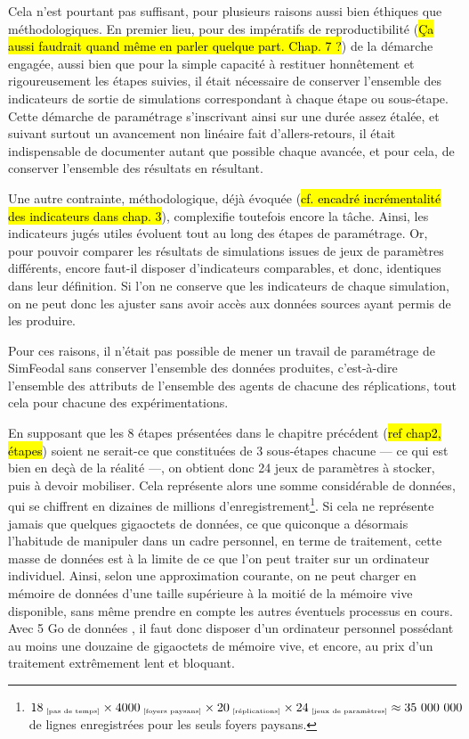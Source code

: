 	Cela n'est pourtant pas suffisant, pour plusieurs raisons aussi bien éthiques que méthodologiques.
	En premier lieu, pour des impératifs de reproductibilité (\hl{Ça aussi faudrait quand même en parler quelque part. Chap. 7 ?}) de la démarche engagée, aussi bien que pour la simple capacité à restituer honnêtement et rigoureusement les étapes suivies, il était nécessaire de conserver l'ensemble des indicateurs de sortie de simulations correspondant à chaque étape ou sous-étape.
	Cette démarche de paramétrage s'inscrivant ainsi sur une durée assez étalée, et suivant surtout un avancement non linéaire fait d'allers-retours, il était indispensable de documenter autant que possible chaque avancée, et pour cela, de conserver l'ensemble des résultats en résultant.

	Une autre contrainte, méthodologique, déjà évoquée (\hl{cf. encadré incrémentalité des indicateurs dans chap. 3}), complexifie toutefois encore la tâche.
	Ainsi, les indicateurs jugés utiles évoluent tout au long des étapes de paramétrage.
	Or, pour pouvoir comparer les résultats de simulations issues de jeux de paramètres différents, encore faut-il disposer d'indicateurs comparables, et donc, identiques dans leur définition.
	Si l'on ne conserve que les indicateurs de chaque simulation, on ne peut donc les ajuster sans avoir accès aux données sources ayant permis de les produire.

	Pour ces raisons, il n'était pas possible de mener un travail de paramétrage de SimFeodal sans conserver l'ensemble des données produites, c'est-à-dire l'ensemble des attributs de l'ensemble des agents de chacune des réplications, tout cela pour chacune des expérimentations.

	En supposant que les 8 étapes présentées dans le chapitre précédent (\hl{ref chap2, étapes}) soient ne serait-ce que constituées de 3 sous-étapes chacune --- ce qui est bien en deçà de la réalité ---, on obtient donc 24 jeux de paramètres à stocker, puis à devoir mobiliser.
	Cela représente alors une somme considérable de données, qui se chiffrent en dizaines de millions d'enregistrement\footnote{
	$18_{\text{\tiny ~[pas de temps]}} \times 4000_{\text{\tiny ~[foyers paysans]}} \times 20_{\text{\tiny ~[réplications]}} \times 24_{\text{\tiny ~[jeux de paramètres]}} \approx 35~000~000$ de lignes enregistrées pour les seuls foyers paysans.
	}.
	Si cela ne représente jamais que quelques gigaoctets de données, ce que quiconque a désormais l'habitude de manipuler dans un cadre personnel, en terme de traitement, cette masse de données est à la limite de ce que l'on peut traiter sur un ordinateur individuel.
	Ainsi, selon une approximation courante, on ne peut charger en mémoire de données d'une taille supérieure à la moitié de la mémoire vive disponible, sans même prendre en compte les autres éventuels processus en cours.
	Avec 5 Go de données , il faut donc disposer d'un ordinateur personnel possédant au moins une douzaine de gigaoctets de mémoire vive, et encore, au prix d'un traitement extrêmement lent et bloquant.
	

